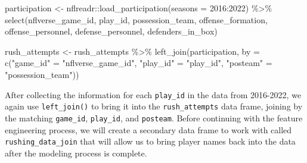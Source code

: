 \documentclass[
  letterpaper,
]{krantz}
\newenvironment{Shaded}{\begin{snugshade}}{\end{snugshade}}
\newcommand{\AttributeTok}[1]{\textcolor[rgb]{0.40,0.45,0.13}{#1}}
\newcommand{\DecValTok}[1]{\textcolor[rgb]{0.68,0.00,0.00}{#1}}
\newcommand{\FunctionTok}[1]{\textcolor[rgb]{0.28,0.35,0.67}{#1}}
\newcommand{\NormalTok}[1]{\textcolor[rgb]{0.00,0.23,0.31}{#1}}
\newcommand{\OtherTok}[1]{\textcolor[rgb]{0.00,0.23,0.31}{#1}}
\newcommand{\SpecialCharTok}[1]{\textcolor[rgb]{0.37,0.37,0.37}{#1}}
\newcommand{\StringTok}[1]{\textcolor[rgb]{0.13,0.47,0.30}{#1}}
\begin{document}
\begin{Shaded}
\begin{Highlighting}[]
\NormalTok{participation }\OtherTok{\textless{}{-}}\NormalTok{ nflreadr}\SpecialCharTok{::}\FunctionTok{load\_participation}\NormalTok{(}\AttributeTok{seasons =} \DecValTok{2016}\SpecialCharTok{:}\DecValTok{2022}\NormalTok{) }\SpecialCharTok{\%\textgreater{}\%}
  \FunctionTok{select}\NormalTok{(nflverse\_game\_id, play\_id, possession\_team, offense\_formation,}
\NormalTok{         offense\_personnel, defense\_personnel, defenders\_in\_box)}

\NormalTok{rush\_attempts }\OtherTok{\textless{}{-}}\NormalTok{ rush\_attempts }\SpecialCharTok{\%\textgreater{}\%}
  \FunctionTok{left\_join}\NormalTok{(participation, }\AttributeTok{by =} \FunctionTok{c}\NormalTok{(}\StringTok{"game\_id"} \OtherTok{=} \StringTok{"nflverse\_game\_id"}\NormalTok{,}
                                  \StringTok{"play\_id"} \OtherTok{=} \StringTok{"play\_id"}\NormalTok{,}
                                  \StringTok{"posteam"} \OtherTok{=} \StringTok{"possession\_team"}\NormalTok{))}
\end{Highlighting}
\end{Shaded}

After collecting the information for each \texttt{play\_id} in the data
from 2016-2022, we again use \texttt{left\_join()} to bring it into the
\texttt{rush\_attempts} data frame, joining by the matching
\texttt{game\_id}, \texttt{play\_id}, and \texttt{posteam}. Before
continuing with the feature engineering process, we will create a
secondary data frame to work with called \texttt{rushing\_data\_join}
that will allow us to bring player names back into the data after the
modeling process is complete.
\end{document}
